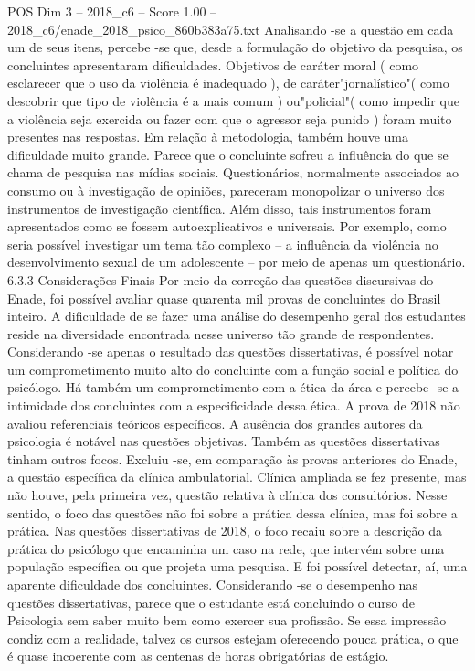 \begin{textsample}{POS Dim 3 – 2018\_c6 – Score 1.00 – 2018\_c6/enade\_2018\_psico\_860b383a75.txt}
Analisando -se a questão em cada um de seus itens, percebe -se que, desde a formulação do objetivo da pesquisa, os concluintes apresentaram dificuldades.
Objetivos de caráter moral ( como esclarecer que o uso da violência é inadequado ), de caráter"jornalístico"( como descobrir que tipo de violência é a mais comum ) ou"policial"( como impedir que a violência seja exercida ou fazer com que o agressor seja punido ) foram muito presentes nas respostas.
Em relação à metodologia, também houve uma dificuldade muito grande.
Parece que o concluinte sofreu a influência do que se chama de pesquisa nas mídias sociais.
Questionários, normalmente associados ao consumo ou à investigação de opiniões, pareceram monopolizar o universo dos instrumentos de investigação científica.
Além disso, tais instrumentos foram apresentados como se fossem autoexplicativos e universais.
Por exemplo, como seria possível investigar um tema tão complexo – a influência da violência no desenvolvimento sexual de um adolescente – por meio de apenas um questionário. 6.3.3 Considerações Finais Por meio da correção das questões discursivas do Enade, foi possível avaliar quase quarenta mil provas de concluintes do Brasil inteiro.
A dificuldade de se fazer uma análise do desempenho geral dos estudantes reside na diversidade encontrada nesse universo tão grande de respondentes.
Considerando -se apenas o resultado das questões dissertativas, é possível notar um comprometimento muito alto do concluinte com a função social e política do psicólogo.
Há também um comprometimento com a ética da área e percebe -se a intimidade dos concluintes com a especificidade dessa ética.
A prova de 2018 não avaliou referenciais teóricos específicos.
A ausência dos grandes autores da psicologia é notável nas questões objetivas.
Também as questões dissertativas tinham outros focos.
Excluiu -se, em comparação às provas anteriores do Enade, a questão específica da clínica ambulatorial.
Clínica ampliada se fez presente, mas não houve, pela primeira vez, questão relativa à clínica dos consultórios.
Nesse sentido, o foco das questões não foi sobre a prática dessa clínica, mas foi sobre a prática.
Nas questões dissertativas de 2018, o foco recaiu sobre a descrição da prática do psicólogo que encaminha um caso na rede, que intervém sobre uma população específica ou que projeta uma pesquisa.
E foi possível detectar, aí, uma aparente dificuldade dos concluintes.
Considerando -se o desempenho nas questões dissertativas, parece que o estudante está concluindo o curso de Psicologia sem saber muito bem como exercer sua profissão.
Se essa impressão condiz com a realidade, talvez os cursos estejam oferecendo pouca prática, o que é quase incoerente com as centenas de horas obrigatórias de estágio.

\end{textsample}
